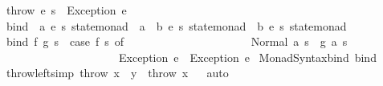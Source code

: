 \begin{isabellebody}
\ {\isachardoublequoteopen}throw\ e\ s\ {\isacharequal}{\kern0pt}\ Exception\ e{\isachardoublequoteclose}\isanewline
\isanewline
{}\isamarkupfalse%
\ bind\ {\isacharcolon}{\kern0pt}{\isacharcolon}{\kern0pt}\ {\isachardoublequoteopen}{\isacharparenleft}{\kern0pt}{\isacharprime}{\kern0pt}a{\isacharcomma}{\kern0pt}\ {\isacharprime}{\kern0pt}e{\isacharcomma}{\kern0pt}\ {\isacharprime}{\kern0pt}s{\isacharparenright}{\kern0pt}\ state{\isacharunderscore}{\kern0pt}monad\ {\isasymRightarrow}\ {\isacharparenleft}{\kern0pt}{\isacharprime}{\kern0pt}a\ {\isasymRightarrow}\ {\isacharparenleft}{\kern0pt}{\isacharprime}{\kern0pt}b{\isacharcomma}{\kern0pt}\ {\isacharprime}{\kern0pt}e{\isacharcomma}{\kern0pt}\ {\isacharprime}{\kern0pt}s{\isacharparenright}{\kern0pt}\ state{\isacharunderscore}{\kern0pt}monad{\isacharparenright}{\kern0pt}\ {\isasymRightarrow}\ {\isacharparenleft}{\kern0pt}{\isacharprime}{\kern0pt}b{\isacharcomma}{\kern0pt}\ {\isacharprime}{\kern0pt}e{\isacharcomma}{\kern0pt}\ {\isacharprime}{\kern0pt}s{\isacharparenright}{\kern0pt}\ state{\isacharunderscore}{\kern0pt}monad{\isachardoublequoteclose}\ {\isacharparenleft}{\kern0pt}\ {\isachardoublequoteopen}{\isachargreater}{\kern0pt}{\isachargreater}{\kern0pt}{\isacharequal}{\kern0pt}{\isachardoublequoteclose}\ {}{}{\isacharparenright}{\kern0pt}\isanewline
{}\ {\isachardoublequoteopen}bind\ f\ g\ s\ {\isacharequal}{\kern0pt}\ {\isacharparenleft}{\kern0pt}case\ f\ s\ of\isanewline
\ \ \ \ \ \ \ \ \ \ \ \ \ \ \ \ \ \ \ \ \ \ Normal\ {\isacharparenleft}{\kern0pt}a{\isacharcomma}{\kern0pt}\ s{\isacharprime}{\kern0pt}{\isacharparenright}{\kern0pt}\ {\isasymRightarrow}\ g\ a\ s{\isacharprime}{\kern0pt}\isanewline
\ \ \ \ \ \ \ \ \ \ \ \ \ \ \ \ \ \ \ \ {\isacharbar}{\kern0pt}\ Exception\ e\ {\isasymRightarrow}\ Exception\ e{\isacharparenright}{\kern0pt}{\isachardoublequoteclose}\isanewline
\isanewline
{}\isamarkupfalse%
\ Monad{\isacharunderscore}{\kern0pt}Syntax{\isachardot}{\kern0pt}bind\ bind\isanewline
\isanewline
{}\isamarkupfalse%
\ throw{\isacharunderscore}{\kern0pt}left{\isacharbrackleft}{\kern0pt}simp{\isacharbrackright}{\kern0pt}{\isacharcolon}{\kern0pt}\ {\isachardoublequoteopen}throw\ x\ {\isasymbind}\ y\ {\isacharequal}{\kern0pt}\ throw\ x{\isachardoublequoteclose}%
\isadelimproof
\ %
\endisadelimproof
%
\isatagproof
{}\isamarkupfalse%
\ auto%
\endisatagproof
{\isafoldproof}%
%
\isadelimproof
%
\endisadelimproof
%
\isadelimdocument

\end{isabellebody}
